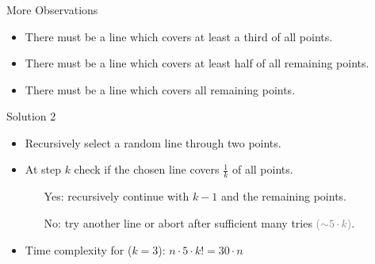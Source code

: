 \begin{frame}
	\frametitle{\problemtitle}
	\begin{block}{More Observations}
		\begin{itemize}
			\item There must be a line which covers at least \alert{a third} of all points.
			\pause
			\item There must be a line which covers at least \alert{half} of all remaining points.
			\pause
			\item There must be a line which covers \alert{all} remaining points.
		\end{itemize}
	\end{block}
	\pause
	\begin{block}{Solution 2}
		\begin{itemize}
			\item Recursively select a random line through two points.
			\item At step $k$ check if the chosen line covers $\frac{1}{k}$ of all points.
			\pause
			\begin{itemize}
				\item[Yes:] recursively continue with $k-1$ and the remaining points.
				\pause
				\item[No:] try another line or abort after sufficient many tries \textcolor{gray}{($\sim 5\cdot k$)}.
			\end{itemize}
			\pause
			\item Time complexity for ($k=3$): $n\cdot5\cdot k!=30\cdot n$
		\end{itemize}
	\end{block}
\end{frame}




